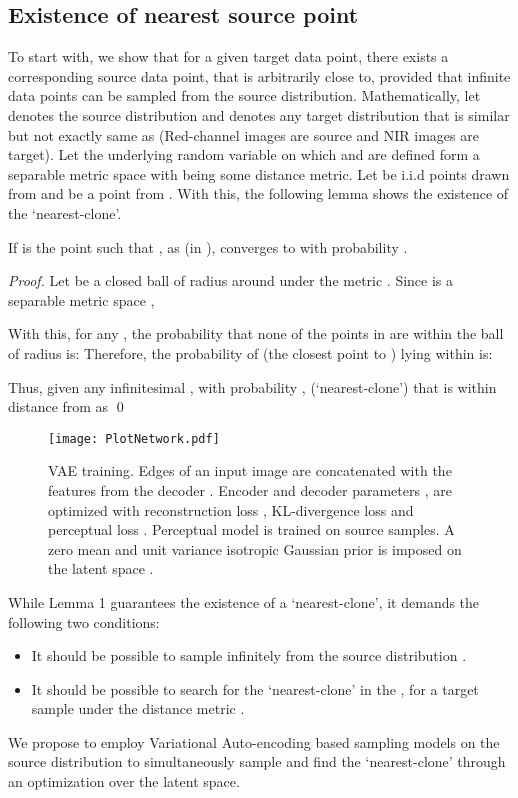\documentclass[runningheads]{llncs}
\begin{document}
\subsection{Existence of nearest source point}
To start with, we show that for a given target data point, there exists a corresponding source data point,  that is arbitrarily close to, provided that infinite data points can be sampled from the source distribution. Mathematically, let  denotes the source distribution and  denotes any target distribution that is similar but not exactly same as  (Red-channel images are source and NIR images are target). Let the underlying random variable on which   and  are defined form a separable metric space  with  being some distance metric. Let  be i.i.d points drawn from  and  be a point from . With this, the following lemma shows the existence of the `nearest-clone'. 
\begin{lemma}
If  is the point such that , as  (in ),  converges to   with probability . 
\end{lemma}
\begin{proof}
Let  be a closed ball of radius  around  under the metric . Since  is a separable metric space \cite{cover1967nearest},  

With this, for any , the probability that  none of the points in  are within the ball  of radius  is:
Therefore, the probability of  (the closest point to ) lying within  is: 

Thus, given any infinitesimal , with probability ,  (`nearest-clone') that is within   distance from  as \qed
 \end{proof}
\begin{figure*}[h]
\centering
\texttt{[image: PlotNetwork.pdf]}
    \caption{VAE training. Edges of an input image are concatenated with the features from the decoder . Encoder and decoder parameters ,  are optimized with reconstruction loss , KL-divergence loss  and perceptual loss . Perceptual model  is trained on source samples. A zero mean and unit variance isotropic Gaussian prior is imposed on the latent space . }
    \label{fig:architecture}
\end{figure*} 
While Lemma 1 guarantees the existence of a `nearest-clone', it demands the following two conditions: 
\begin{itemize}
\item It should be possible to sample infinitely from the source distribution .
\item It should be possible to search for the `nearest-clone' in the , for a target sample  under the distance metric .
\end{itemize}
We propose to employ Variational Auto-encoding based sampling models on the source distribution to simultaneously sample and find the `nearest-clone' through an optimization over the latent space.  
\end{document}
